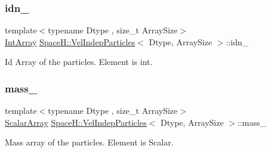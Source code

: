 \mbox{\label{class_space_h_1_1_vel_indep_particles_ab6aa82e238fe3af9835b7458db276b22}} 
\subsubsection{\texorpdfstring{idn\+\_\+}{idn\_}}
{\footnotesize\ttfamily template$<$typename Dtype , size\+\_\+t Array\+Size$>$ \\
\mbox{\hyperlink{class_space_h_1_1_vel_indep_particles_abe09426d740c8c2425c5fc3789c9c744}{Int\+Array}} \mbox{\hyperlink{class_space_h_1_1_vel_indep_particles}{Space\+H\+::\+Vel\+Indep\+Particles}}$<$ Dtype, Array\+Size $>$\+::idn\+\_\+\hspace{0.3cm}{\ttfamily [protected]}}



Id Array of the particles. Element is int. 

\mbox{\label{class_space_h_1_1_vel_indep_particles_a654dbb0f084532405e0a23e0b1fe92c2}} 
\subsubsection{\texorpdfstring{mass\+\_\+}{mass\_}}
{\footnotesize\ttfamily template$<$typename Dtype , size\+\_\+t Array\+Size$>$ \\
\mbox{\hyperlink{class_space_h_1_1_vel_indep_particles_ab5efeef52fb5748c25fbfeb04b64640e}{Scalar\+Array}} \mbox{\hyperlink{class_space_h_1_1_vel_indep_particles}{Space\+H\+::\+Vel\+Indep\+Particles}}$<$ Dtype, Array\+Size $>$\+::mass\+\_\+\hspace{0.3cm}{\ttfamily [protected]}}



Mass array of the particles. Element is Scalar. 

\mbox{\label{class_space_h_1_1_vel_indep_particles_af04a72a36cef0d27d243f2523a8d24b8}} 
